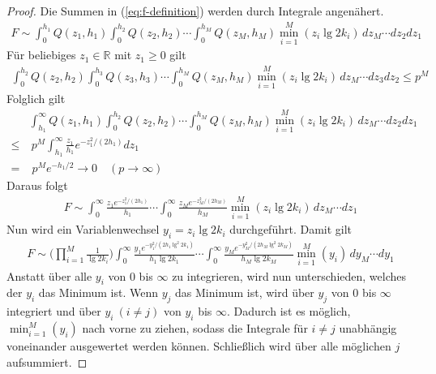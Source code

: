 \documentclass[a4paper, 11pt, ngerman]{article}
\newcommand{\R}{\mathbb{R}}
\theoremstyle{definition}
\theoremstyle{plain}
\theoremstyle{remark}
\begin{document}
\begin{proof}
    Die Summen in (\ref{eq:f-definition}) werden durch Integrale angenähert.
    \begin{align*}
        F \sim
        \int_0^{h_1} Q(z_1, h_1)
        \int_0^{h_2} Q(z_2, h_2) \cdots
        \int_0^{h_M} Q(z_M, h_M)
        \min_{i = 1}^M(z_i \lg 2k_i) \, dz_M \cdots dz_2 dz_1
    \end{align*}
    Für beliebiges $z_1 \in \R$ mit $z_1 \ge 0$ gilt
    \begin{align*}
        \int_0^{h_2} Q(z_2, h_2)
        \int_0^{h_3} Q(z_3, h_3) \cdots
        \int_0^{h_M} Q(z_M, h_M)
        \min_{i = 1}^M(z_i \lg 2k_i) \, dz_M \cdots dz_3 dz_2 \le p^M
    \end{align*}
    Folglich gilt
    \begin{align*}
            & \int_{h_1}^{\infty} Q(z_1, h_1)
        \int_0^{h_2} Q(z_2, h_2) \cdots
        \int_0^{h_M} Q(z_M, h_M)
        \min_{i = 1}^M(z_i \lg 2k_i) \, dz_M \cdots dz_2 dz_1 \\
        \le & \ p^M \int_{h_1}^{\infty}
        \frac {z_1} {h_1} e^{-z_1^2/(2h_1)} dz_1              \\
        =   & \; p^M e^{-h_1/2} \to 0 \quad (p \to \infty)
    \end{align*}
    Daraus folgt
    \begin{align*}
        F \sim
        \int_0^{\infty}
        \frac {z_1 e^{-z_1^2/(2h_1)}} {h_1}  \cdots
        \int_0^{\infty}
        \frac {z_M e^{-z_M^2/(2h_M)}} {h_M}
        \min_{i = 1}^M(z_i \lg 2k_i) \, dz_M \cdots dz_1
    \end{align*}
    Nun wird ein Variablenwechsel $y_i = z_i \lg 2k_i$ durchgeführt. Damit gilt
    \begin{align*}
        F \sim
        \Bigg (\prod_{i = 1}^M \frac 1 {\lg 2k_i} \Bigg )
        \int_0^{\infty}
        \frac {y_1 e^{-y_1^2 / (2h_1 \lg^2 2k_1)}} {h_1\lg 2k_1}  \cdots
        \int_0^{\infty}
        \frac {y_M e^{-y_M^2 / (2h_M \lg^2 2k_M)}} {h_M \lg 2k_M}
        \min_{i = 1}^M(y_i) \, dy_M \cdots dy_1
    \end{align*}
    Anstatt über alle $y_i$ von $0$ bis $\infty$ zu integrieren, wird nun unterschieden, welches der $y_i$ das Minimum ist. Wenn $y_j$ das Minimum ist, wird über $y_j$ von $0$ bis $\infty$ integriert und über $y_i \ (i \ne j)$ von $y_i$ bis $\infty$. Dadurch ist es möglich, $\min_{i = 1}^M (y_i)$ nach vorne zu ziehen, sodass die Integrale für $i \ne j$ unabhängig voneinander ausgewertet werden können. Schließlich wird über alle möglichen $j$ aufsummiert.

\end{proof}
\end{document}
